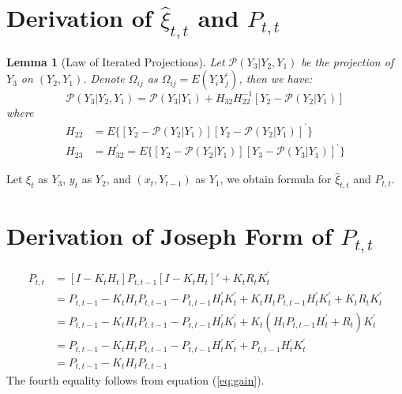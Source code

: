 \documentclass[12pt]{article}
\newtheorem{lemma}{Lemma}
\numberwithin{equation}{section}
\begin{document}
\section{Derivation of $\hat{\xi}_{t,t}$ and $P_{t,t}$} \label{ap:iter_proj}
\begin{lemma}[Law of Iterated Projections] \label{lem:1}
    Let $\mathcal{P}(Y_3|Y_2,Y_1)$ be the projection of $Y_3$ on $(Y_2, Y_1)$. Denote $\Omega_{ij}$ as $\Omega_{ij} = E(Y_iY_j^{'})$, then we have:
    \[
        \mathcal{P}(Y_3|Y_2,Y_1) = \mathcal{P}(Y_3|Y_1)+H_{32}H_{22}^{-1}[Y_2 - \mathcal{P}(Y_2|Y_1)]
    \]
    where 
    \begin{align*}
        H_{22} &= E\{[Y_2-\mathcal{P}(Y_2|Y_1)][Y_2-\mathcal{P}(Y_2|Y_1)]^{'}\} \\
        H_{23} &= H_{32}^{'} = E\{[Y_2-\mathcal{P}(Y_2|Y_1)][Y_3-\mathcal{P}(Y_3|Y_1)]^{'}\} 
    \end{align*}

\end{lemma}
Let $\xi_t$ as $Y_3$, $y_t$ as $Y_2$, and $(x_t,Y_{t-1})$ as $Y_1$, we obtain formula for $\hat{\xi}_{t,t}$ and $P_{t,t}$.

\section{Derivation of Joseph Form of $P_{t,t}$} \label{ap:joseph}
\begin{align*}
    P_{t,t} &= [I - K_tH_t]P_{t,t-1}[I - K_tH_t]' + K_tR_tK_t^{'} \\
    &= P_{t,t-1} - K_tH_tP_{t,t-1} - P_{t,t-1}H_t^{'}K_t^{'} + K_tH_tP_{t,t-1}H_t^{'}K_t^{'} + K_tR_tK_t^{'} \\
    &= P_{t,t-1} - K_tH_tP_{t,t-1} - P_{t,t-1}H_t^{'}K_t^{'} + K_t(H_tP_{t,t-1}H_t^{'} + R_t)K_t^{'} \\
    &= P_{t,t-1} - K_tH_tP_{t,t-1} - P_{t,t-1}H_t^{'}K_t^{'} + P_{t,t-1}H_t^{'}K_t^{'} \\
    &= P_{t,t-1} - K_tH_tP_{t,t-1}
\end{align*}
The fourth equality follows from equation (\ref{eq:gain}).
\end{document}
